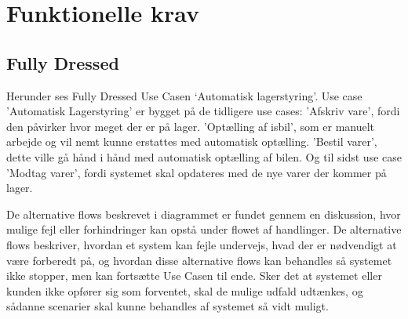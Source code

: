 \section{Funktionelle krav}\label{sec:funktionelle-krav}

\subsection{Fully Dressed} \label{fullydressed}

Herunder ses Fully Dressed Use Casen ‘Automatisk lagerstyring’. Use case 'Automatisk Lagerstyring' er bygget på de tidligere use cases: 'Afskriv vare', fordi den påvirker hvor meget der er på lager. 'Optælling af isbil', som er manuelt arbejde og vil nemt kunne erstattes med automatisk optælling. 'Bestil varer', dette ville gå hånd i hånd med automatisk optælling af bilen. Og til sidst use case 'Modtag varer', fordi systemet skal opdateres med de nye varer der kommer på lager. 

De alternative flows beskrevet i diagrammet er fundet gennem en diskussion, hvor mulige fejl eller forhindringer kan opstå under flowet af handlinger. De alternative flows beskriver, hvordan et system kan fejle undervejs, hvad der er nødvendigt at være forberedt på, og hvordan disse alternative flows kan behandles så systemet ikke stopper, men kan fortsætte Use Casen til ende. Sker det at systemet eller kunden ikke opfører sig som forventet, skal de mulige udfald udtænkes, og sådanne scenarier skal kunne behandles af systemet så vidt muligt.

